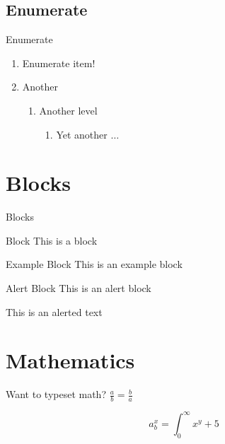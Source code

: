 \documentclass{beamer}
\begin{document}
	\subsection{Enumerate}
	
	\begin{frame}{Enumerate}
		\begin{enumerate}
			\item Enumerate item!
			\item Another
			\begin{enumerate}
				\item Another level
				\begin{enumerate}
					\item Yet another $\ldots$
				\end{enumerate}
			\end{enumerate}
		\end{enumerate}
	\end{frame}


	\section{Blocks}
	\begin{frame}{Blocks}
		
		\begin{block}{Block}
			This is a block
		\end{block}
		
		\begin{exampleblock}{Example Block}
			This is an example block
		\end{exampleblock}

		\begin{alertblock}{Alert Block}
			This is an alert block
		\end{alertblock}
		
		This is an \alert{alerted} text
	\end{frame}
	
	\section{Mathematics}
	\begin{frame}{Want to typeset math?}
		$\frac a b = \frac b a$
		
		$$a^x_b = \int_{0}^{\infty}x^y+ 5$$
		
	\end{frame}
\end{document}
